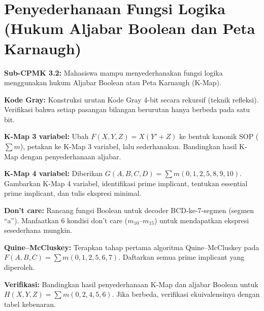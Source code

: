 \documentclass[../main]{subfiles}
\begin{document}
\chapter{Penyederhanaan Fungsi Logika (Hukum Aljabar Boolean dan Peta Karnaugh)}

\begin{subcpmk}
  \item \textbf{Sub-CPMK 3.2:} Mahasiswa mampu menyederhanakan fungsi logika menggunakan hukum Aljabar Boolean atau Peta Karnaugh (K-Map).
\end{subcpmk}










\begin{aktivitas}
  \item \textbf{Kode Gray:} Konstruksi urutan Kode Gray 4-bit secara rekursif (teknik refleksi). Verifikasi bahwa setiap pasangan bilangan berurutan hanya berbeda pada satu bit.
  \item \textbf{K-Map 3 variabel:} Ubah $F(X,Y,Z) = X(Y' + Z)$ ke bentuk kanonik SOP ($\sum m$), petakan ke K-Map 3 variabel, lalu sederhanakan. Bandingkan hasil K-Map dengan penyederhanaan aljabar.
  \item \textbf{K-Map 4 variabel:} Diberikan $G(A,B,C,D) = \sum m(0, 1, 2, 5, 8, 9, 10)$. Gambarkan K-Map 4 variabel, identifikasi prime implicant, tentukan essential prime implicant, dan tulis ekspresi minimal.
  \item \textbf{Don't care:} Rancang fungsi Boolean untuk decoder BCD-ke-7-segmen (segmen ``a''). Manfaatkan 6 kondisi don't care ($m_{10}$--$m_{15}$) untuk mendapatkan ekspresi sesederhana mungkin.
  \item \textbf{Quine--McCluskey:} Terapkan tahap pertama algoritma Quine--McCluskey pada $F(A,B,C) = \sum m(0, 1, 2, 5, 6, 7)$. Daftarkan semua prime implicant yang diperoleh.
  \item \textbf{Verifikasi:} Bandingkan hasil penyederhanaan K-Map dan aljabar Boolean untuk $H(X,Y,Z) = \sum m(0, 2, 4, 5, 6)$. Jika berbeda, verifikasi ekuivalensinya dengan tabel kebenaran.
\end{aktivitas}
\end{document}
